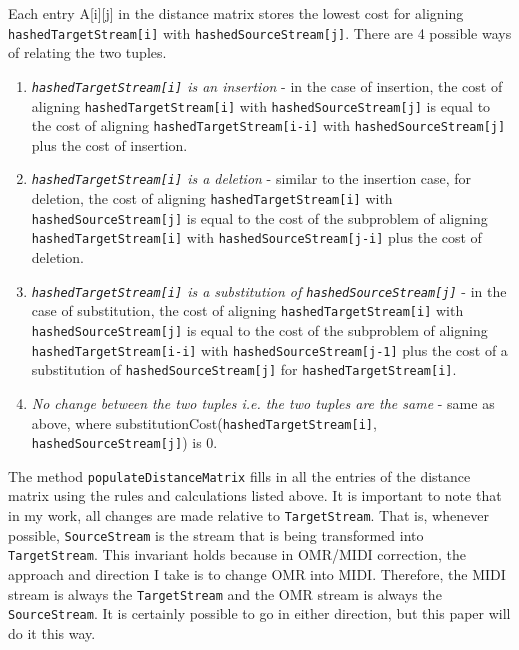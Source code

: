Each entry A[i][j] in the distance matrix stores the lowest cost for aligning\\
 \texttt{hashedTargetStream[i]} with \texttt{hashedSourceStream[j]}. There are 4 possible ways of relating the two tuples. 
\begin{enumerate}
\item \textit{\texttt{hashedTargetStream[i]} is an insertion} - in the case of insertion, the cost of aligning \texttt{hashedTargetStream[i]} with \texttt{hashedSourceStream[j]} is equal to the cost of aligning \texttt{hashedTargetStream[i-i]} with \texttt{hashedSourceStream[j]} plus the cost of insertion.

\item \textit{\texttt{hashedTargetStream[i]} is a deletion} - similar to the insertion case, for deletion, the cost of aligning \texttt{hashedTargetStream[i]} with \texttt{hashedSourceStream[j]} is equal to the cost of the subproblem of aligning \texttt{hashedTargetStream[i]}  with \texttt{hashedSourceStream[j-i]} plus the cost of deletion.

\item \textit{\texttt{hashedTargetStream[i]} is a substitution of \texttt{hashedSourceStream[j]}} - in the case of substitution, the cost of aligning \texttt{hashedTargetStream[i]} with \texttt{hashedSourceStream[j]} is equal to the cost of the subproblem of aligning \texttt{hashedTargetStream[i-i]} with \texttt{hashedSourceStream[j-1]} plus the cost of a substitution of  \texttt{hashedSourceStream[j]} for \texttt{hashedTargetStream[i]}.
 
\item \textit{No change between the two tuples i.e. the two tuples are the same} - same as above, where substitutionCost(\texttt{hashedTargetStream[i]}, \texttt{hashedSourceStream[j]}) is 0.
\end{enumerate}

The method \texttt{populateDistanceMatrix} fills in all the entries of the distance matrix using the rules and calculations listed above. It is important to note that in my work, all changes are made relative to \texttt{TargetStream}. That is, whenever possible, \texttt{SourceStream} is the stream that is being transformed into \texttt{TargetStream}. This invariant holds because in OMR/MIDI correction, the approach and direction I take is to change OMR into MIDI. Therefore, the MIDI stream is always the \texttt{TargetStream} and the OMR stream is always the \texttt{SourceStream}. It is certainly possible to go in either direction, but this paper will do it this way. 

